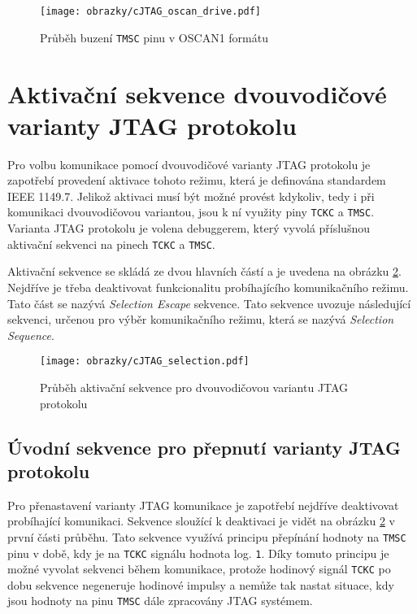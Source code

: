 \begin{figure}[!h]
  \begin{center}
    \texttt{[image: obrazky/cJTAG\_oscan\_drive.pdf]}
  \end{center}
  \caption{Průběh buzení \texttt{\acs{TMSC}} pinu v OSCAN1 formátu}
	\label{fig:oscan_drive}
\end{figure}


\section{Aktivační sekvence dvouvodičové varianty \acs{JTAG} protokolu}
Pro volbu komunikace pomocí dvouvodičové varianty \acs{JTAG} protokolu je zapotřebí provedení aktivace tohoto režimu, která je definována standardem IEEE 1149.7. Jelikož aktivaci musí být možné provést kdykoliv, tedy i při komunikaci dvouvodičovou variantou, jsou k ní využity piny \texttt{\acs{TCKC}} a \texttt{\acs{TMSC}}. Varianta \acs{JTAG} protokolu je volena debuggerem, který vyvolá příslušnou aktivační sekvenci na pinech \texttt{\acs{TCKC}} a \texttt{\acs{TMSC}}. \cite{IEEE_1149-7}

Aktivační sekvence se skládá ze dvou hlavních částí a je uvedena na obrázku \ref{fig:cJTAG_sel}. Nejdříve je třeba deaktivovat funkcionalitu probíhajícího komunikačního režimu. Tato část se nazývá \textit{Selection Escape} sekvence. Tato sekvence uvozuje následující sekvenci, určenou pro výběr komunikačního režimu, která se nazývá \textit{Selection Sequence}. \cite{IEEE_1149-7}

\begin{figure}[!h]
  \begin{center}
    \texttt{[image: obrazky/cJTAG\_selection.pdf]}
  \end{center}
  \caption{Průběh aktivační sekvence pro dvouvodičovou variantu \acs{JTAG} protokolu}
	\label{fig:cJTAG_sel}
\end{figure}

\subsection{Úvodní sekvence pro přepnutí varianty \acs{JTAG} protokolu}	\label{subsec:sel_escape}
Pro přenastavení varianty \acs{JTAG} komunikace je zapotřebí nejdříve deaktivovat probíhající komunikaci. Sekvence sloužící k deaktivaci je vidět na obrázku \ref{fig:cJTAG_sel} v první části průběhu. Tato sekvence využívá principu přepínání hodnoty na \texttt{\acs{TMSC}} pinu v době, kdy je na \texttt{\acs{TCKC}} signálu hodnota log. \texttt{1}. Díky tomuto principu je možné vyvolat sekvenci během komunikace, protože hodinový signál \texttt{\acs{TCKC}} po dobu sekvence negeneruje hodinové impulsy a nemůže tak nastat situace, kdy jsou hodnoty na pinu \texttt{\acs{TMSC}} dále zpracovány \acs{JTAG} systémem. \cite{IEEE_1149-7}

